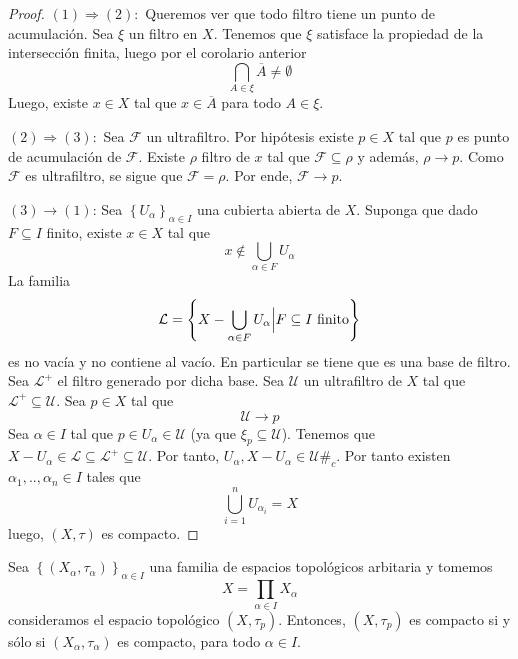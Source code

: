 \documentclass[12pt]{report}
\theoremstyle{largebreak}
\newcommand\contradiction{\ensuremath{\#_c}}
\newcommand{\Cls}[1]{\ensuremath{\overline{#1}}}
\begin{document}
    \begin{proof}
        $(1)\Rightarrow (2):$ Queremos ver que todo filtro tiene un punto de acumulación. Sea $\xi$ un filtro en $X$. Tenemos que $\xi$ satisface la propiedad de la intersección finita, luego por el corolario anterior
        \begin{equation*}
            \bigcap_{A\in \xi}\Cls{A}\neq\emptyset
        \end{equation*}
        Luego, existe $x\in X$ tal que $x\in\Cls{A}$ para todo $A\in\xi$.

        $(2)\Rightarrow(3):$ Sea $\mathcal{F}$ un ultrafiltro. Por hipótesis existe $p\in X$ tal que $p$ es punto de acumulación de $\mathcal{F}$. Existe $\rho$ filtro de $x$ tal que $\mathcal{F}\subseteq\rho$ y además, $\rho\rightarrow p$. Como $\mathcal{F}$ es ultrafiltro, se sigue que $\mathcal{F}=\rho$. Por ende, $\mathcal{F}\rightarrow p$.

        $(3)\rightarrow (1)$: Sea $\left\{U_\alpha \right\}_{\alpha\in I}$ una cubierta abierta de $X$. Suponga que dado $F\subseteq I$ finito, existe $x\in X$ tal que
        \begin{equation*}
            x\notin\bigcup_{ \alpha\in F}U_{\alpha}
        \end{equation*}
        La familia
        \begin{equation*}
            \mathcal{L}=\left\{X-\bigcup_{\alpha\in F}U_\alpha\Big|F\subseteq I \textup{ finito} \right\}
        \end{equation*}
        es no vacía y no contiene al vacío. En particular se tiene que es una base de filtro. Sea $\mathcal{L}^+$ el filtro generado por dicha base. Sea $\mathcal{U}$ un ultrafiltro de $X$ tal que $\mathcal{L}^+\subseteq\mathcal{U}$. Sea $p\in X$ tal que
        \begin{equation*}
            \mathcal{U}\rightarrow p
        \end{equation*}
        Sea $\alpha\in I$ tal que $p\in U_\alpha\in\mathcal{U}$ (ya que $\xi_p\subseteq\mathcal{U}$). Tenemos que $X-U_\alpha\in\mathcal{L}\subseteq\mathcal{L}^+\subseteq\mathcal{U}$. Por tanto, $U_\alpha,X-U_\alpha\in\mathcal{U}$\contradiction. Por tanto existen $\alpha_1,..,\alpha_n\in I$ tales que
        \begin{equation*}
            \bigcup_{ i=1}^n U_{\alpha_i}=X
        \end{equation*}
        luego, $(X,\tau)$ es compacto.
    \end{proof}

    \begin{theor}
        Sea $\left\{(X_\alpha,\tau_\alpha) \right\}_{\alpha\in I}$ una familia de espacios topológicos arbitaria y tomemos
        \begin{equation*}
            X=\prod_{\alpha\in I} X_\alpha
        \end{equation*}
        consideramos el espacio topológico $(X,\tau_p)$. Entonces, $(X,\tau_p)$ es compacto si y sólo si $(X_\alpha,\tau_\alpha)$ es compacto, para todo $\alpha\in I$.
    \end{theor}
\end{document}

